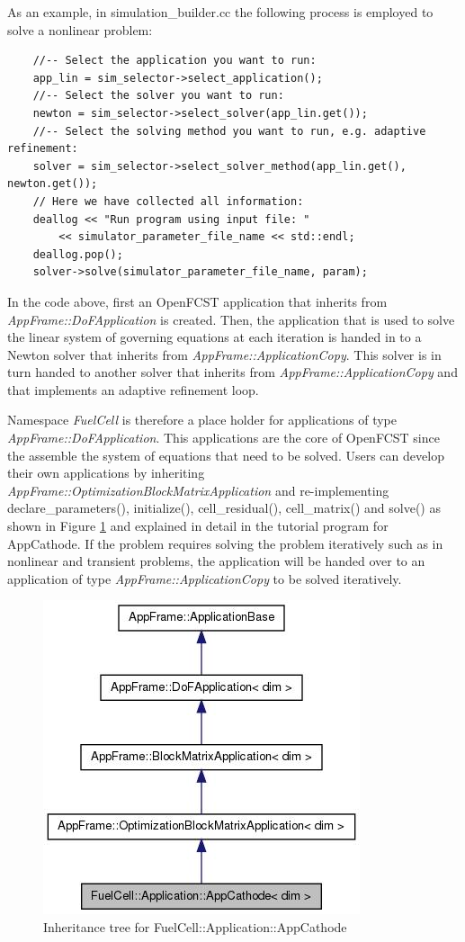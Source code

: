 As an example, in simulation\_builder.cc the following process is employed to solve a nonlinear problem:
\begin{lstlisting}
	//-- Select the application you want to run:
	app_lin = sim_selector->select_application();
	//-- Select the solver you want to run:
	newton = sim_selector->select_solver(app_lin.get());
	//-- Select the solving method you want to run, e.g. adaptive refinement:
	solver = sim_selector->select_solver_method(app_lin.get(), newton.get());
	// Here we have collected all information:
	deallog << "Run program using input file: " 
		<< simulator_parameter_file_name << std::endl;
	deallog.pop();
	solver->solve(simulator_parameter_file_name, param);
\end{lstlisting}
In the code above, first an OpenFCST application that inherits from \textit{AppFrame::DoFApplication} is created. Then, the application that is used to solve the linear system of governing equations at each iteration is handed in to a Newton solver that inherits from \textit{AppFrame::ApplicationCopy}. This solver is in turn handed to another solver that inherits from \textit{AppFrame::ApplicationCopy} and that implements an adaptive refinement loop.

Namespace \textit{FuelCell} is therefore a place holder for applications of type \textit{AppFrame::DoFApplication}. This applications are the core of OpenFCST since the assemble the system of equations that need to be solved. Users can develop their own applications by inheriting \textit{AppFrame::OptimizationBlockMatrixApplication} and re-implementing declare\_parameters(), initialize(), cell\_residual(), cell\_matrix() and solve() as shown in Figure \ref{fig:AppCathode_Tree} and explained in detail in the tutorial program for AppCathode. If the problem requires solving the problem iteratively such as in nonlinear and transient problems, the application will be handed over to an application of type \textit{AppFrame::ApplicationCopy} to be solved iteratively.

\begin{figure}[btp]
\begin{center} 
\includegraphics[scale=0.75]{./figures/classFuelCell_Application_AppCathode__inherit__graph.jpg}
\caption{Inheritance tree for FuelCell::Application::AppCathode}
\label{fig:AppCathode_Tree}
\end{center}
\end{figure}


